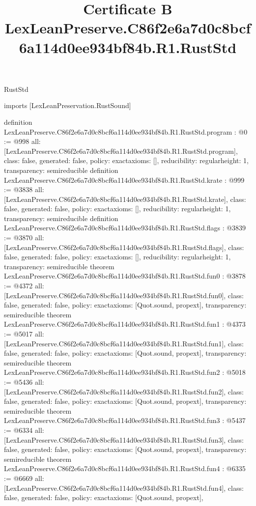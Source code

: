 \begin{lexlean}{RustStd}
\title{Certificate B LexLeanPreserve.C86f2e6a7d0c8bcf6a114d0ee934bf84b.R1.RustStd}
\begin{coremodule}
imports [LexLeanPreservation.RustSound]

definition LexLeanPreserve.C86f2e6a7d0c8bcf6a114d0ee934bf84b.R1.RustStd.program : @0 := @998 {
  all: [LexLeanPreserve.C86f2e6a7d0c8bcf6a114d0ee934bf84b.R1.RustStd.program],
  class: false,
  generated: false,
  policy: exact{axioms: []},
  reducibility: regular{height: 1},
  transparency: semireducible
}
definition LexLeanPreserve.C86f2e6a7d0c8bcf6a114d0ee934bf84b.R1.RustStd.krate : @999 := @3838 {
  all: [LexLeanPreserve.C86f2e6a7d0c8bcf6a114d0ee934bf84b.R1.RustStd.krate],
  class: false,
  generated: false,
  policy: exact{axioms: []},
  reducibility: regular{height: 1},
  transparency: semireducible
}
definition LexLeanPreserve.C86f2e6a7d0c8bcf6a114d0ee934bf84b.R1.RustStd.flags : @3839 := @3870 {
  all: [LexLeanPreserve.C86f2e6a7d0c8bcf6a114d0ee934bf84b.R1.RustStd.flags],
  class: false,
  generated: false,
  policy: exact{axioms: []},
  reducibility: regular{height: 1},
  transparency: semireducible
}
theorem LexLeanPreserve.C86f2e6a7d0c8bcf6a114d0ee934bf84b.R1.RustStd.fun0 : @3878 := @4372 {
  all: [LexLeanPreserve.C86f2e6a7d0c8bcf6a114d0ee934bf84b.R1.RustStd.fun0],
  class: false,
  generated: false,
  policy: exact{axioms: [Quot.sound, propext]},
  transparency: semireducible
}
theorem LexLeanPreserve.C86f2e6a7d0c8bcf6a114d0ee934bf84b.R1.RustStd.fun1 : @4373 := @5017 {
  all: [LexLeanPreserve.C86f2e6a7d0c8bcf6a114d0ee934bf84b.R1.RustStd.fun1],
  class: false,
  generated: false,
  policy: exact{axioms: [Quot.sound, propext]},
  transparency: semireducible
}
theorem LexLeanPreserve.C86f2e6a7d0c8bcf6a114d0ee934bf84b.R1.RustStd.fun2 : @5018 := @5436 {
  all: [LexLeanPreserve.C86f2e6a7d0c8bcf6a114d0ee934bf84b.R1.RustStd.fun2],
  class: false,
  generated: false,
  policy: exact{axioms: [Quot.sound, propext]},
  transparency: semireducible
}
theorem LexLeanPreserve.C86f2e6a7d0c8bcf6a114d0ee934bf84b.R1.RustStd.fun3 : @5437 := @6334 {
  all: [LexLeanPreserve.C86f2e6a7d0c8bcf6a114d0ee934bf84b.R1.RustStd.fun3],
  class: false,
  generated: false,
  policy: exact{axioms: [Quot.sound, propext]},
  transparency: semireducible
}
theorem LexLeanPreserve.C86f2e6a7d0c8bcf6a114d0ee934bf84b.R1.RustStd.fun4 : @6335 := @6669 {
  all: [LexLeanPreserve.C86f2e6a7d0c8bcf6a114d0ee934bf84b.R1.RustStd.fun4],
  class: false,
  generated: false,
  policy: exact{axioms: [Quot.sound, propext]},
}
\end{coremodule}
\end{lexlean}
